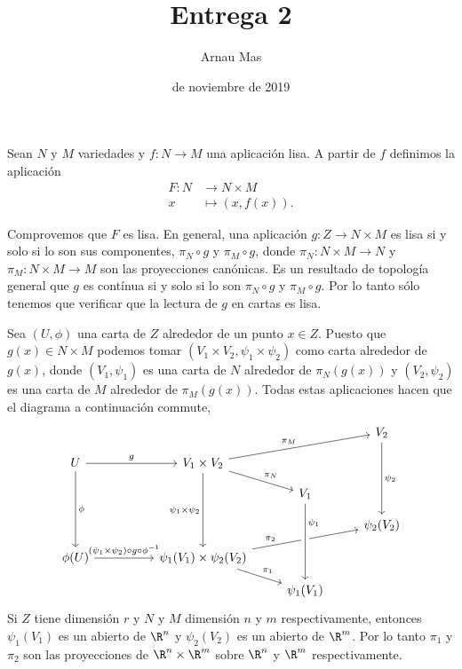 \documentclass[12pt]{article}
\title{\sffamily {\bfseries Topología de variedades:} Entrega 2}
\author{\sffamily Arnau Mas}
\date{\sffamily 22 de noviembre de 2019}
\begin{document}
\maketitle

Sean \( N \) y \( M \) variedades y \( f \colon N \to M \) una aplicación lisa. A partir
de \( f \) definimos la aplicación
\begin{align*}
	F \colon N & \longrightarrow N \times M \\
	x & \longmapsto (x, f(x)).
\end{align*}

Comprovemos que \( F \) es lisa. En general, una aplicación \( g \colon Z \to N \times M
\) es lisa si y solo si lo son sus componentes, \( \pi_N \circ g \) y \( \pi_M \circ g \),
donde \( \pi_N \colon N \times M \to N \) y \( \pi_M \colon N \times M \to M \) son las
proyecciones canónicas. Es un resultado de topología general que \( g \) es contínua si y
solo si lo son \( \pi_N \circ g \) y \( \pi_M \circ g \). Por lo tanto sólo tenemos que
verificar que la lectura de \( g \) en cartas es lisa. 

Sea \( (U, \phi) \) una carta de \( Z \) alrededor de un punto \( x \in Z \). Puesto que
\( g(x) \in N \times M \) podemos tomar \( (V_1 \times V_2, \psi_1 \times \psi_2) \) como
carta alrededor de \( g(x) \), donde \( (V_1, \psi_1) \) es una carta de \( N \) alrededor
de \( \pi_N(g(x)) \) y \( (V_2, \psi_2) \) es una carta de \( M \) alrededor de \(
\pi_M(g(x)) \). Todas estas aplicaciones hacen que el diagrama a continuación commute,
\begin{equation*}
	\begin{tikzcd}[row sep = small]
			& & & & V_2 \arrow[ddd, "\psi_2"] \\
		U \arrow[rr, "g"] \arrow[ddd, "\phi"] & & V_1 \times V_2 \arrow[ddd, "\psi_1 \times
		\psi_2"'] \arrow[rru, "\pi_M"] \arrow[rd, "\pi_N"] & & \\
			& & & V_1  & \\
			& & & & \psi_2(V_2) \\
		\phi(U) \arrow[rr, "(\psi_1 \times \psi_2) \circ g \circ \phi^{-1}"] & & \psi_1(V_1)
		\times \psi_2(V_2) \arrow[dr, "\pi_1"] \arrow[rru, near start, "\pi_2"] & & \\
			& & & \psi_1(V_1) \arrow[from=uuu, crossing over, near start,"\psi_1"] &
	\end{tikzcd}
\end{equation*}
Si \( Z \) tiene dimensión \( r \) y \( N \) y \( M \) dimensión \( n \) y \( m \)
respectivamente, entonces \( \psi_1(V_1) \) es un abierto de \( \R^n \) y \( \psi_2(V_2)
\) es un abierto de \( \R^m \). Por lo tanto \( \pi_1 \) y \( \pi_2 \) son las
proyecciones de \( \R^n \times \R^m \) sobre \( \R^n \) y \( \R^m \) respectivamente.
\end{document}
